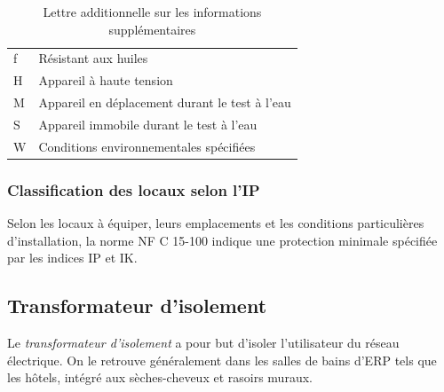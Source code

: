 \begin{minipage}[t]{0.39\linewidth}
\begin{table}[H]
\caption{Lettre additionnelle sur les informations supplémentaires}
\begin{tabularx}{\linewidth}{P{1.5cm} X}
\toprule
{}		&  \\
\midrule
f							& Résistant aux huiles \\
\addlinespace
H							& Appareil à haute tension \\
\addlinespace
M							& Appareil en déplacement durant le test à l'eau \\
\addlinespace
S							& Appareil immobile durant le test à l'eau \\
\addlinespace
W							& Conditions environnementales spécifiées \\
\bottomrule
\end{tabularx}
\end{table}
\end{minipage}

\newpage
\begin{landscape}
\newpage



\newpage
\end{landscape}
\newpage

\subsubsection{Classification des locaux selon l'IP}

Selon les locaux à équiper, leurs emplacements et les conditions particulières d'installation, la norme NF C 15-100 indique une protection minimale spécifiée par les indices IP et IK.



\subsection{Transformateur d'isolement\label{subsec:tranformateur_isolement}}

Le \emph{transformateur d'isolement} a pour but d'isoler l'utilisateur du réseau électrique. On le retrouve généralement dans les salles de bains d'ERP tels que les hôtels, intégré aux sèches-cheveux et rasoirs muraux.\\ 



